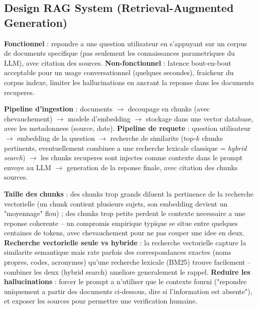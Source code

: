 \documentclass[11pt,a4paper]{article}
\newenvironment{sujet}[1]{%
  \subsection{#1}
}{%
  \bigskip
}
\begin{document}
\begin{sujet}{Design RAG System (Retrieval-Augmented Generation)}

\begin{req}
\textbf{Fonctionnel} : repondre a une question utilisateur en s'appuyant sur un corpus de documents specifique (pas seulement les connaissances parametriques du LLM), avec citation des sources. \textbf{Non-fonctionnel} : latence bout-en-bout acceptable pour un usage conversationnel (quelques secondes), fraicheur du corpus indexe, limiter les hallucinations en ancrant la reponse dans les documents recuperes.
\end{req}

\begin{archbox}
\textbf{Pipeline d'ingestion} : documents $\to$ decoupage en chunks (avec chevauchement) $\to$ modele d'embedding $\to$ stockage dans une vector database, avec les metadonnees (source, date). \textbf{Pipeline de requete} : question utilisateur $\to$ embedding de la question $\to$ recherche de similarite (top-$k$ chunks pertinents, eventuellement combinee a une recherche lexicale classique = \emph{hybrid search}) $\to$ les chunks recuperes sont injectes comme contexte dans le prompt envoye au LLM $\to$ generation de la reponse finale, avec citation des chunks sources.
\end{archbox}

\begin{tradeoff}
\textbf{Taille des chunks} : des chunks trop grands diluent la pertinence de la recherche vectorielle (un chunk contient plusieurs sujets, son embedding devient un "moyennage" flou) ; des chunks trop petits perdent le contexte necessaire a une reponse coherente -- un compromis empirique typique se situe entre quelques centaines de tokens, avec chevauchement pour ne pas couper une idee en deux. \textbf{Recherche vectorielle seule vs hybride} : la recherche vectorielle capture la similarite semantique mais rate parfois des correspondances exactes (noms propres, codes, acronymes) qu'une recherche lexicale (BM25) trouve facilement -- combiner les deux (hybrid search) ameliore generalement le rappel. \textbf{Reduire les hallucinations} : forcer le prompt a n'utiliser que le contexte fourni ("repondre uniquement a partir des documents ci-dessous, dire si l'information est absente"), et exposer les sources pour permettre une verification humaine.
\end{tradeoff}

\end{sujet}
\end{document}
